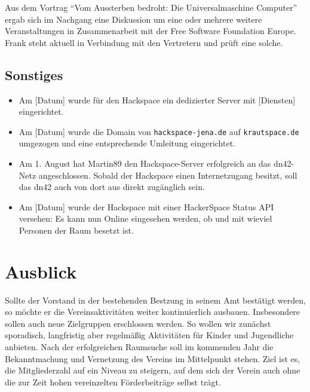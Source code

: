 \documentclass[10pt,DIV16]{scrartcl}
\begin{document}
Aus dem Vortrag "`Vom Aussterben bedroht: Die Universalmaschine 
Computer"' ergab sich im Nachgang eine Diskussion um eine oder 
mehrere weitere Veranstaltungen in Zusammenarbeit mit der Free 
Software Foundation Europe. Frank steht aktuell in Verbindung mit 
den Vertretern und prüft eine solche. 

\subsection{Sonstiges}

\begin{itemize}
	\item
		Am [Datum] wurde für den Hackspace ein dedizierter Server mit
		[Diensten] eingerichtet.
	\item
		Am [Datum] wurde die Domain von \texttt{hackspace-jena.de} auf
		\texttt{krautspace.de} umgezogen und eine entsprechende Umleitung
		eingerichtet.
	\item
		Am 1. August hat Martin89 den Hackspace-Server erfolgreich an das
		dn42-Netz angeschlossen.  Sobald der Hackspace einen Internetzugang
		besitzt, soll das dn42 auch von dort aus direkt zugänglich sein.
	\item
		Am [Datum] wurde der Hackspace mit einer HackerSpace Status API
		versehen:  Es kann nun Online eingesehen werden, ob und mit wieviel
		Personen der Raum besetzt ist.
\end{itemize}

\section{Ausblick}

Sollte der Vorstand in der bestehenden Bestzung in seinem Amt bestätigt
werden, so möchte er die Vereinsaktivitäten weiter kontinuierlich ausbauen.
Insbesondere sollen auch neue Zielgruppen erschlossen werden.  So wollen wir
zunächst sporadisch, langfristig aber regelmäßig Aktivitäten für Kinder und
Jugendliche anbieten.  Nach der erfolgreichen Raumsuche soll im kommenden Jahr
die Bekanntmachung und Vernetzung des Vereins im Mittelpunkt stehen.  Ziel ist
es, die Mitgliederzahl auf ein Niveau zu steigern, auf dem sich der Verein
auch ohne die zur Zeit hohen vereinzelten Förderbeiträge selbst trägt.
\end{document}
